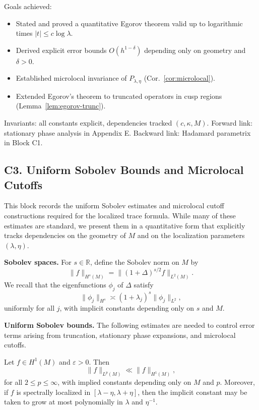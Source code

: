 \medskip

\begin{auditblock}[C2]
Goals achieved:
\begin{itemize}
  \item Stated and proved a quantitative Egorov theorem valid up to logarithmic times $|t| \leq c \log \lambda$.
  \item Derived explicit error bounds $O(h^{1-\delta})$ depending only on geometry and $\delta > 0$.
  \item Established microlocal invariance of $P_{\lambda,\eta}$ (Cor.~\ref{cor:microlocal}).
  \item Extended Egorov’s theorem to truncated operators in cusp regions (Lemma~\ref{lem:egorov-trunc}).
\end{itemize}
Invariants: all constants explicit, dependencies tracked $(c, \kappa, M)$. Forward link: stationary phase analysis in Appendix E. Backward link: Hadamard parametrix in Block C1.
\end{auditblock}

\subsection*{C3. Uniform Sobolev Bounds and Microlocal Cutoffs}

This block records the uniform Sobolev estimates and microlocal cutoff constructions required for the localized trace formula. While many of these estimates are standard, we present them in a quantitative form that explicitly tracks dependencies on the geometry of $M$ and on the localization parameters $(\lambda,\eta)$.

\medskip

\textbf{Sobolev spaces.} For $s \in \mathbb{R}$, define the Sobolev norm on $M$ by
\[
\| f \|_{H^s(M)} = \| (1+\Delta)^{s/2} f \|_{L^2(M)}.
\]
We recall that the eigenfunctions $\phi_j$ of $\Delta$ satisfy
\[
\| \phi_j \|_{H^s} \asymp (1+\lambda_j)^s \| \phi_j \|_{L^2},
\]
uniformly for all $j$, with implicit constants depending only on $s$ and $M$.

\medskip

\textbf{Uniform Sobolev bounds.} The following estimates are needed to control error terms arising from truncation, stationary phase expansions, and microlocal cutoffs.

\begin{theorem}\label{thm:sobolev}
Let $f \in H^1(M)$ and $\varepsilon > 0$. Then
\[
\| f \|_{L^p(M)} \ll \| f \|_{H^1(M)},
\]
for all $2 \leq p \leq \infty$, with implied constants depending only on $M$ and $p$. Moreover, if $f$ is spectrally localized in $[\lambda-\eta,\lambda+\eta]$, then the implicit constant may be taken to grow at most polynomially in $\lambda$ and $\eta^{-1}$.
\end{theorem}

